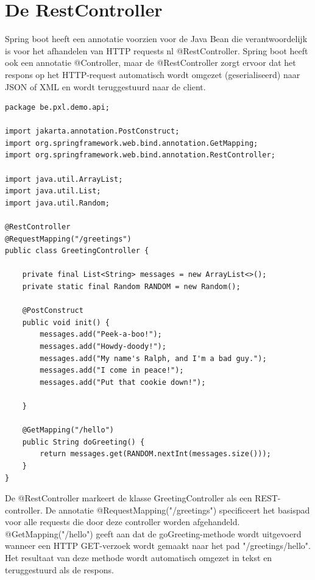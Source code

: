\section{De RestController}

Spring boot heeft een annotatie voorzien voor de Java Bean die verantwoordelijk is voor het afhandelen van HTTP requests nl @RestController. Spring boot heeft ook een annotatie @Controller, maar de @RestController zorgt ervoor dat het respons op het HTTP-request automatisch wordt omgezet (geserialiseerd) naar JSON of XML en wordt teruggestuurd naar de client.


\begin{lstlisting}[frame=single]
package be.pxl.demo.api;

import jakarta.annotation.PostConstruct;
import org.springframework.web.bind.annotation.GetMapping;
import org.springframework.web.bind.annotation.RestController;

import java.util.ArrayList;
import java.util.List;
import java.util.Random;

@RestController
@RequestMapping("/greetings")
public class GreetingController {

    private final List<String> messages = new ArrayList<>();
    private static final Random RANDOM = new Random();

    @PostConstruct
    public void init() {
        messages.add("Peek-a-boo!");
        messages.add("Howdy-doody!");
        messages.add("My name's Ralph, and I'm a bad guy.");
        messages.add("I come in peace!");
        messages.add("Put that cookie down!");

    }

    @GetMapping("/hello")
    public String doGreeting() {
        return messages.get(RANDOM.nextInt(messages.size()));
    }
}
\end{lstlisting}

De @RestController markeert de klasse GreetingController als een REST-controller.
De annotatie @RequestMapping("/greetings") specificeert het basispad voor alle requests die door deze controller worden afgehandeld.
@GetMapping("/hello") geeft aan dat de goGreeting-methode wordt uitgevoerd wanneer een HTTP GET-verzoek wordt gemaakt naar het pad "/greetings/hello". Het resultaat van deze methode wordt automatisch omgezet in tekst en teruggestuurd als de respons.

